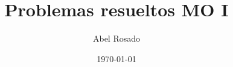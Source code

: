 \documentclass[14pt,a4paper,oneside]{extarticle}
\theoremstyle{plain}
\theoremstyle{definition}
\theoremstyle{remark}
\numberwithin{equation}{section}
\numberwithin{figure}{section}
\numberwithin{theorem}{section}
\begin{document}

\linespread{1}

\title{Problemas resueltos MO I}
\author{Abel Rosado}
\date{\today}

\maketitle

\tableofcontents







\end{document}
